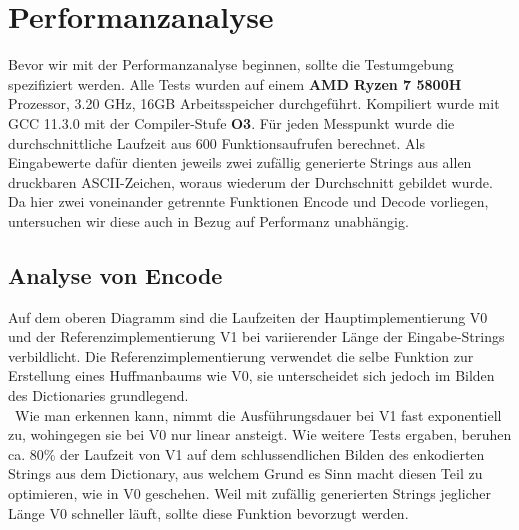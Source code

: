 \documentclass[course=erap]{aspdoc}
\begin{document}
\section{Performanzanalyse}
Bevor wir mit der Performanzanalyse beginnen, sollte die Testumgebung spezifiziert werden. Alle Tests wurden auf einem \textbf{AMD Ryzen 7 5800H} Prozessor, 3.20 GHz, 16GB Arbeitsspeicher durchgeführt. Kompiliert wurde mit GCC 11.3.0 mit der Compiler-Stufe \textbf{O3}. Für jeden Messpunkt wurde die durchschnittliche Laufzeit aus 600 Funktionsaufrufen berechnet. Als Eingabewerte dafür dienten jeweils zwei zufällig generierte Strings aus allen druckbaren ASCII-Zeichen, woraus wiederum der Durchschnitt gebildet wurde. Da hier zwei voneinander getrennte Funktionen Encode und Decode vorliegen, untersuchen wir diese auch in Bezug auf Performanz unabhängig.

\subsection{Analyse von Encode}

\begin{center}
\end{center}Auf dem oberen Diagramm sind die Laufzeiten der Hauptimplementierung V0 und der Referenzimplementierung V1
bei variierender Länge der Eingabe-Strings verbildlicht. Die Referenzimplementierung verwendet die selbe Funktion zur Erstellung eines Huffmanbaums wie V0, sie unterscheidet sich jedoch im Bilden des Dictionaries grundlegend.\\
\,\,\,Wie man erkennen kann, nimmt die Ausführungsdauer bei V1 fast exponentiell zu, wohingegen sie bei V0 nur linear ansteigt. Wie weitere Tests ergaben, beruhen ca. 80\% der Laufzeit von V1 auf dem schlussendlichen Bilden des enkodierten Strings aus dem Dictionary, aus welchem Grund es Sinn macht diesen Teil zu optimieren, wie in V0 geschehen. Weil mit zufällig generierten Strings jeglicher Länge V0 schneller läuft, sollte diese Funktion bevorzugt werden.
\end{document}
